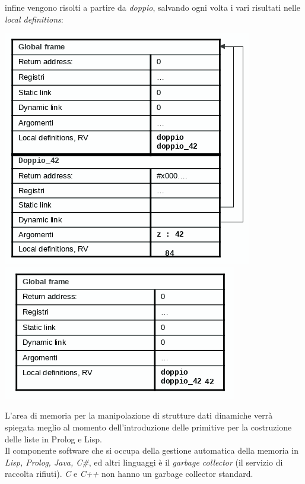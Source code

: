 \documentclass[a4paper,12pt, oneside]{book}
\begin{document}
infine vengono risolti a partire da \textit{doppio}, salvando ogni volta i vari risultati nelle \textit{local definitions}:
\begin{center}
\includegraphics[scale=0.4]{img/sta6.png}
\quad
\includegraphics[scale=0.4]{img/sta7.png}
\end{center}
L'area di memoria per la manipolazione di strutture dati dinamiche verrà spiegata meglio al momento dell'introduzione delle primitive per la costruzione delle liste in Prolog e Lisp.\\
Il componente software che si occupa della gestione automatica della memoria in \textit{Lisp, Prolog, Java, C\#}, ed altri linguaggi è il \textit{garbage collector} (il servizio di raccolta rifiuti). \textit{C} e \textit{C++} non hanno un garbage collector standard.
\end{document}
